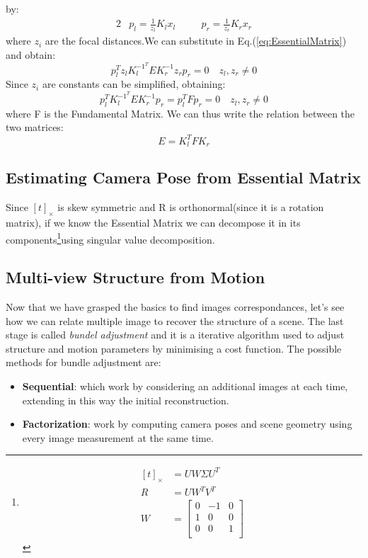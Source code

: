 by:
\begin{alignat}{2}
    &p_l = \frac{1}{z_l}K_l x_l  &\quad &p_r = \frac{1}{z_r}K_r x_r
\end{alignat}
where $z_i$ are the focal distances.We can substitute in Eq.(\ref{eq:EssentialMatrix}) and obtain:
\begin{equation}
    p_l^T z_l K^{-1^T}_l E K_r^{-1} z_r p_r = 0 \quad z_l,z_r \neq 0
\end{equation}
Since $z_i$ are constants can be simplified, obtaining:
\begin{equation}
    \label{eq:Fund}
    p_l^T  K^{-1^T}_l E K_r^{-1} p_r = p_l^T  F p_r=0 \quad z_l,z_r \neq 0
\end{equation}
where F is the Fundamental Matrix. We can thus write the relation between the two matrices:
\begin{equation}
    E = K_l ^{T} F K_r
\end{equation}



 \subsection{Estimating Camera Pose from Essential Matrix}
 Since  $ \left[ t\right]_{\times} $ is skew symmetric and R is orthonormal(since 
it is a rotation matrix), if we know the Essential Matrix we can decompose it
in its components\footnote{
    \begin{align}
        \left[ t\right]_{\times} &=  U W \Sigma U^T  \\
        R &= U W^T V^T \\
        W&=
        \begin{bmatrix}
          0 & -1& 0 \\
          1 & 0 & 0 \\
          0 & 0 & 1     \\
        \end{bmatrix}
    \end{align}
}using singular value decomposition.


\subsection{Multi-view Structure from Motion}
Now that we have grasped the basics to find images correspondances, let's see how we can relate multiple image to recover the structure of a scene.
The last stage is called \textit{bundel adjustment} and it is a iterative algorithm used to adjust structure and motion parameters by minimising a cost function.
The possible methods for bundle adjustment are:
\begin{itemize}
    \item \textbf{Sequential}: which work by considering an additional images at each time, extending in this way the initial reconstruction.
    \item \textbf{Factorization}: work by computing camera poses and scene geometry using every image measurement at the same time.
\end{itemize}

